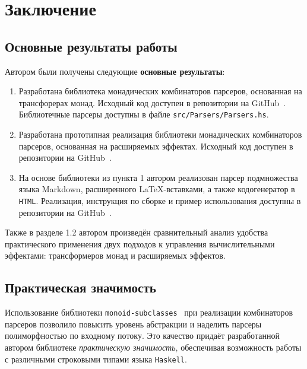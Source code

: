 \chapter{Заключение}

\section{Основные результаты работы} 
  
  Автором были получены следующие \textbf{основные результаты}:

  \begin{enumerate}
    
    \item Разработана библиотека монадических комбинаторов парсеров, основанная 
    на трансфорерах монад. Исходный код доступен в репозитории на GitHub~\cite{mdParse}. Библиотечные парсеры доступны в файле \lstinline{src/Parsers/Parsers.hs}. 


    \item Разработана прототипная реализация библиотеки монадических комбинаторов 
    парсеров, основанная на расширяемых эффектах. Исходный код доступен в 
    репозитории на GitHub~\cite{mdParse}. 

    \item На основе библиотеки из пункта 1 автором реализован парсер подмножества языка
    Markdown, расширенного \LaTeX-вставками, а также кодогенератор в 
    \lstinline{HTML}. Реализация, инструкция по сборке и пример использования 
    доступны в репозитории на GitHub~\cite{mdParse}. 
  \end{enumerate}

  Также в разделе 1.2 автором произведён сравнительный анализ удобства 
  практического применения двух подходов к управления вычислительными эффектами: 
  трансформеров монад и расширяемых эффектов. 

\section{Практическая значимость}

  Использование библиотеки \lstinline{monoid-subclasses}~\cite{monoidSubclassesHackage}
  при реализации комбинаторов парсеров  
  позволило повысить уровень абстракции и наделить парсеры 
  полиморфностью по входному потоку. Это качество 
  придаёт разработанной автором библиотеке \emph{практическую значимость}, 
  обеспечивая возможность работы с различными строковыми типами языка \lstinline{Haskell}.  

